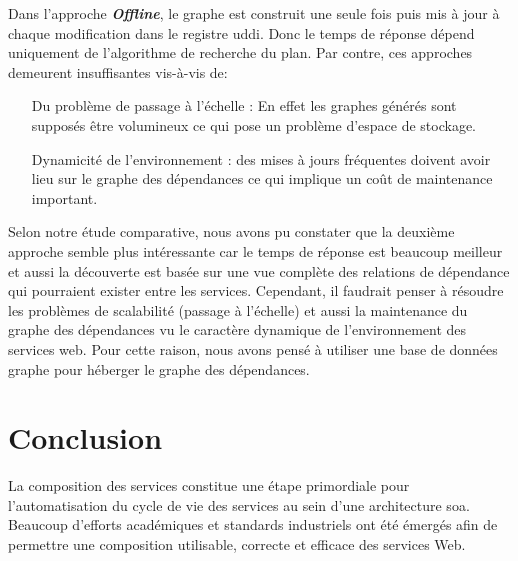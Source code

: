   Dans l'approche \textbf{\textit{Offline}}, le graphe est construit une
  seule fois puis mis à jour à chaque modification dans le registre
  \acrshort{uddi}. Donc le temps de réponse dépend uniquement de
  l'algorithme de recherche du plan. Par contre, ces approches
  demeurent insuffisantes vis-à-vis de:\medskip

  \SpecialItem
  \begin{itemize}
  \item [Du problème de passage à l'échelle]: En effet les graphes
    générés sont supposés être volumineux ce qui pose un problème
    d'espace de stockage.

  \item [Dynamicité de l'environnement]: des mises à jours fréquentes
    doivent avoir lieu sur le graphe des dépendances ce qui implique un
    coût de maintenance important.\bigskip

  \end{itemize}
  \enddescription

\newpage

\newpage


Selon notre étude comparative, nous avons pu constater que la deuxième
approche semble plus intéressante car le temps de réponse est beaucoup
meilleur et aussi la découverte est basée sur une vue complète des
relations de dépendance qui pourraient exister entre les services.
Cependant, il faudrait penser à résoudre les problèmes de scalabilité
(passage à l'échelle) et aussi la maintenance du graphe des dépendances
vu le caractère dynamique de l'environnement des services web.  Pour
cette raison, nous avons pensé à utiliser une base de données graphe
pour héberger le graphe des dépendances.

\section*{Conclusion}
\label{sec:conclusion}
 

La composition des services constitue une étape primordiale pour
l'automatisation du cycle de vie des services au sein d'une
architecture \acrshort{soa}. Beaucoup d'efforts académiques et
standards industriels ont été émergés afin de permettre une
composition utilisable, correcte et efficace des services Web.\medskip


